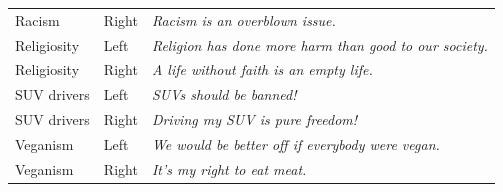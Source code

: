 \begin{table}[H]
\begin{tabular}[t]{lll}
Racism & Right & \emph{Racism is an overblown issue.}\\
Religiosity & Left & \emph{Religion has done more harm than good to our society.}\\
Religiosity & Right & \emph{A life without faith is an empty life.}\\
SUV drivers & Left & \emph{SUVs should be banned!}\\
SUV drivers & Right & \emph{Driving my SUV is pure freedom!}\\
Veganism & Left & \emph{We would be better off if everybody were vegan.}\\
Veganism & Right & \emph{It's my right to eat meat.}\\
\bottomrule
\end{tabular}
\end{table}
